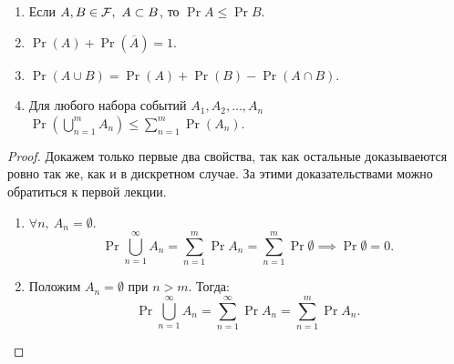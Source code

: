 \begin{itemize}
\begin{lemma}
\begin{enumerate}
            \item Если \(A, B \in \mathcal{F}, \ A \subset B \), то \(\Pr{A} \leq \Pr{B} \).

            \item \(\Pr(A) + \Pr(\overline{A}) = 1\).

            \item \(\Pr(A \cup B) = \Pr(A) + \Pr(B) - \Pr(A \cap B)\).
            \item Для любого набора событий \(A_1, A_2, \ldots, A_n\) \(\Pr\left(\bigcup\limits_{n = 1}^{m} A_n\right) \leq \sum\limits_{n = 1}^{m} \Pr(A_n)\).
        \end{enumerate}
   \end{lemma}

    \begin{proof}
        Докажем только первые два свойства, так как остальные доказываеются ровно так же, как и в дискретном случае. За этими доказательствами можно обратиться к первой лекции.

        \begin{enumerate}
            \item \( \forall n,\ A_n = \emptyset\).
            \[
                \Pr{\bigcup\limits_{n = 1}^{\infty}A_n} = \sum\limits_{n = 1}^{m}\Pr{A_n} = \sum\limits_{n = 1}^{m}\Pr{\emptyset} \implies \Pr{\emptyset} = 0.
            \]

            \item Положим \(A_n = \emptyset \) при \(n > m \). Тогда:
            \[
                \Pr{\bigcup\limits_{n = 1}^{\infty}A_n} = \sum\limits_{n = 1}^{\infty}\Pr{A_n} = \sum\limits_{n = 1}^{m}\Pr{A_n}.
            \]
        \end{enumerate}
    \end{proof}

\end{itemize}

